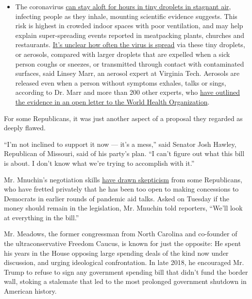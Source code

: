 \begin{itemize}
  \begin{itemize}
  \tightlist
  \item
    The coronavirus
    \href{https://www.nytimes3xbfgragh.onion/2020/07/04/health/239-experts-with-one-big-claim-the-coronavirus-is-airborne.html?action=click\&pgtype=Article\&state=default\&region=MAIN_CONTENT_3\&context=storylines_faq}{can
    stay aloft for hours in tiny droplets in stagnant air}, infecting
    people as they inhale, mounting scientific evidence suggests. This
    risk is highest in crowded indoor spaces with poor ventilation, and
    may help explain super-spreading events reported in meatpacking
    plants, churches and restaurants.
    \href{https://www.nytimes3xbfgragh.onion/2020/07/06/health/coronavirus-airborne-aerosols.html?action=click\&pgtype=Article\&state=default\&region=MAIN_CONTENT_3\&context=storylines_faq}{It's
    unclear how often the virus is spread} via these tiny droplets, or
    aerosols, compared with larger droplets that are expelled when a
    sick person coughs or sneezes, or transmitted through contact with
    contaminated surfaces, said Linsey Marr, an aerosol expert at
    Virginia Tech. Aerosols are released even when a person without
    symptoms exhales, talks or sings, according to Dr. Marr and more
    than 200 other experts, who
    \href{https://academic.oup.com/cid/article/doi/10.1093/cid/ciaa939/5867798}{have
    outlined the evidence in an open letter to the World Health
    Organization}.
  \end{itemize}
\end{itemize}

For some Republicans, it was just another aspect of a proposal they
regarded as deeply flawed.

``I'm not inclined to support it now --- it's a mess,'' said Senator
Josh Hawley, Republican of Missouri, said of his party's plan. ``I can't
figure out what this bill is about. I don't know what we're trying to
accomplish with it.''

Mr. Mnuchin's negotiation skills
\href{https://www.nytimes3xbfgragh.onion/2020/04/17/us/politics/coronavirus-mnuchin-republicans.html}{have
drawn skepticism} from some Republicans, who have fretted privately that
he has been too open to making concessions to Democrats in earlier
rounds of pandemic aid talks. Asked on Tuesday if the money should
remain in the legislation, Mr. Mnuchin told reporters, ``We'll look at
everything in the bill.''

Mr. Meadows, the former congressman from North Carolina and co-founder
of the ultraconservative Freedom Caucus, is known for just the opposite:
He spent his years in the House opposing large spending deals of the
kind now under discussion, and urging ideological confrontation. In late
2018, he encouraged Mr. Trump to refuse to sign any government spending
bill that didn't fund the border wall, stoking a stalemate that led to
the most prolonged government shutdown in American history.


